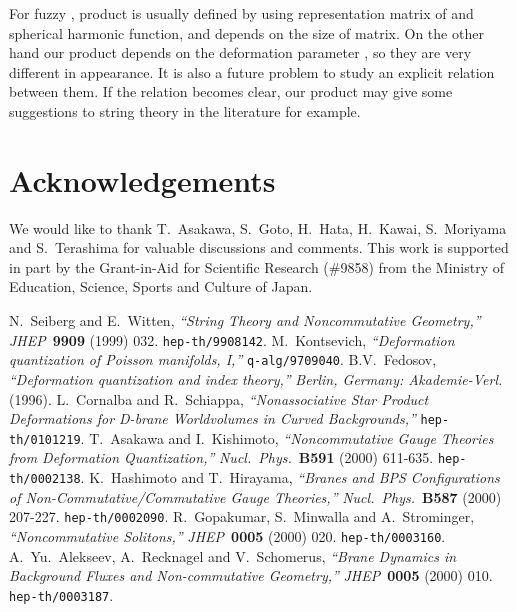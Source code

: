 \documentclass[12pt,a4paper]{article}
\def\h{\hbar}
\begin{document}
For fuzzy \coordHE{}, \myHighlight{$*$}\coordHE{} product is usually defined by using
representation matrix of \coordHE{} and spherical harmonic function,
and depends on the size of matrix. On the other hand our \myHighlight{$*$}\coordHE{} product
depends on the deformation parameter \myHighlight{$\h$}\coordHE{}, so they
are very different in appearance.
It is also a future problem to study an explicit relation between them.
If the relation becomes clear, our \myHighlight{$*$}\coordHE{} product may give some
suggestions to string theory in the literature \cite{SHOME} for example.


\section*{Acknowledgements}
We would like to thank T.~Asakawa, S.~Goto, H.~Hata, H.~Kawai,
S.~Moriyama and S.~Terashima for valuable discussions and comments.
This work is supported in part by the Grant-in-Aid for Scientific
Research (\#9858) from the Ministry of Education, Science, Sports and
Culture of Japan.

\begin{thebibliography}{99}
N.~Seiberg and E.~Witten,
{\it ``String Theory and Noncommutative Geometry,''}
{\sl JHEP}~{\bf 9909} (1999) 032.
{\tt hep-th/9908142}.
M.~Kontsevich,
{\it ``Deformation quantization of Poisson manifolds, I,''}
{\tt q-alg/9709040}.
B.V.~Fedosov,
{\it ``Deformation quantization and index theory,''}
{\sl  Berlin, Germany: Akademie-Verl.} (1996).
L.~Cornalba and R.~Schiappa,
{\it ``Nonassociative Star Product Deformations for D-brane
  Worldvolumes in Curved Backgrounds,''}
{\tt hep-th/0101219}.
T.~Asakawa and I.~Kishimoto,
{\it ``Noncommutative Gauge Theories from Deformation Quantization,''}
{\sl Nucl.~Phys.}~{\bf B591} (2000) 611-635. {\tt hep-th/0002138}.
K.~Hashimoto and T.~Hirayama,
{\it ``Branes and BPS Configurations of Non-Commutative/Commutative Gauge
Theories,''}
{\sl Nucl.~Phys.}~{\bf B587} (2000) 207-227.
{\tt hep-th/0002090}.
R.~Gopakumar, S.~Minwalla and A.~Strominger,
{\it ``Noncommutative Solitons,''}
{\sl JHEP}~{\bf 0005} (2000) 020.
{\tt hep-th/0003160}.
A.~Yu.~Alekseev, A.~Recknagel and  V.~Schomerus,
{\it ``Brane Dynamics in Background Fluxes and Non-commutative
Geometry,''}
{\sl JHEP}~{\bf 0005} (2000) 010.
{\tt hep-th/0003187}.
\end{thebibliography}
\end{document}
